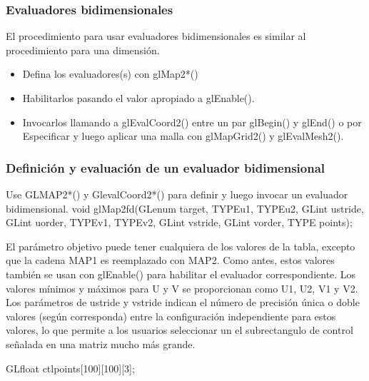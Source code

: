 \documentclass[10.5pt]{beamer}
\begin{document}
\begin{frame}[fragile]
    \frametitle{Evaluadores bidimensionales}
    
El procedimiento para usar evaluadores bidimensionales es similar al procedimiento para una dimensión.

\begin{itemize}
    \item Defina los evaluadores(s) con glMap2*()
    \item Habilitarlos pasando el valor apropiado a glEnable().
    \item Invocarlos llamando a glEvalCoord2() entre un par glBegin() y glEnd() o por
    Especificar y luego aplicar una malla con glMapGrid2() y glEvalMesh2().
\end{itemize}


\end{frame}
\begin{frame}[fragile]
    \frametitle{Definición y evaluación de un evaluador bidimensional}
    
    Use GLMAP2*() y GlevalCoord2*() para definir y luego invocar un evaluador bidimensional.
    void glMap2{fd}(GLenum target, TYPEu1, TYPEu2, GLint ustride,
    GLint uorder, TYPEv1, TYPEv2, GLint vstride,
    GLint vorder, TYPE points);
    
    El parámetro objetivo puede tener cualquiera de los valores de la tabla, excepto que la cadena MAP1 es
    reemplazado con MAP2. Como antes, estos valores también se usan con glEnable() para habilitar el
    evaluador correspondiente. Los valores mínimos y máximos para U y V se proporcionan como U1, U2,
    V1 y V2. Los parámetros de ustride y vstride indican el número de precisión única o doble
    valores (según corresponda) entre la configuración independiente para estos valores, 
    lo que permite a los usuarios seleccionar un
    el subrectangulo de control señalada en  una matriz mucho más grande.
    \begin{alertblock}{}
        \small
        \center
            GLfloat ctlpoints[100][100][3];
    \end{alertblock}
\end{frame}
\end{document}
